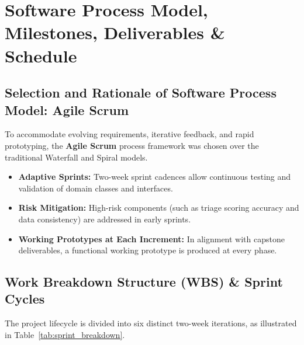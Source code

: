\documentclass[11pt,a4paper]{article}
\begin{document}
\section{Software Process Model, Milestones, Deliverables \& Schedule}

\subsection{Selection and Rationale of Software Process Model: Agile Scrum}
To accommodate evolving requirements, iterative feedback, and rapid prototyping, the \textbf{Agile Scrum} process framework was chosen over the traditional Waterfall and Spiral models.
\begin{itemize}
    \item \textbf{Adaptive Sprints:} Two-week sprint cadences allow continuous testing and validation of domain classes and interfaces.
    \item \textbf{Risk Mitigation:} High-risk components (such as triage scoring accuracy and data consistency) are addressed in early sprints.
    \item \textbf{Working Prototypes at Each Increment:} In alignment with capstone deliverables, a functional working prototype is produced at every phase.
\end{itemize}

\subsection{Work Breakdown Structure (WBS) \& Sprint Cycles}
The project lifecycle is divided into six distinct two-week iterations, as illustrated in Table~\ref{tab:sprint_breakdown}.
\end{document}

